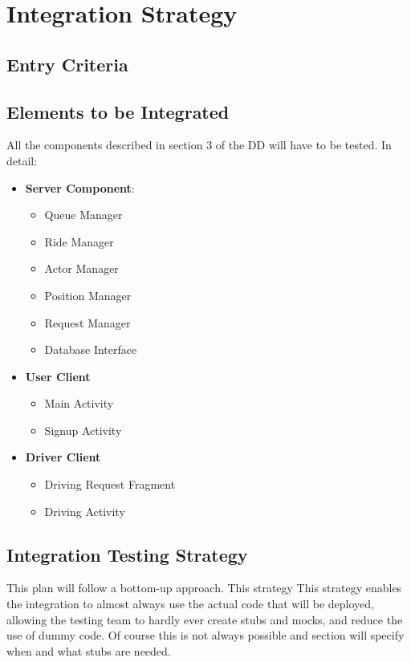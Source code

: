 \section{Integration Strategy} %
\label{sec:integration_strategy}

\subsection{Entry Criteria} %
\label{sub:entry_criteria}

\subsection{Elements to be Integrated} %
\label{sub:elements_to_be_integrated}
All the components described in section 3 of the DD will have to be tested.
In detail:
\begin{itemize}
	\item \textbf{Server Component}:
	\begin{itemize}
		\item Queue Manager
		\item Ride Manager
		\item Actor Manager
		\item Position Manager
		\item Request Manager
		\item Database Interface
	\end{itemize}
	\item \textbf{User Client}
	\begin{itemize}
		\item Main Activity
		\item Signup Activity
	\end{itemize}
	\item \textbf{Driver Client}
	\begin{itemize}
		\item Driving Request Fragment
		\item Driving Activity
	\end{itemize}
\end{itemize}

\subsection{Integration Testing Strategy} %
\label{sub:integration_testing_strategy}
This plan will follow a bottom-up approach. This strategy 
This strategy enables the integration to almost always use the actual code that will be deployed, allowing the testing team to hardly ever create stubs and mocks, and reduce the use of dummy code.
Of course this is not always possible and section \emph{} will specify when and what stubs are needed.


